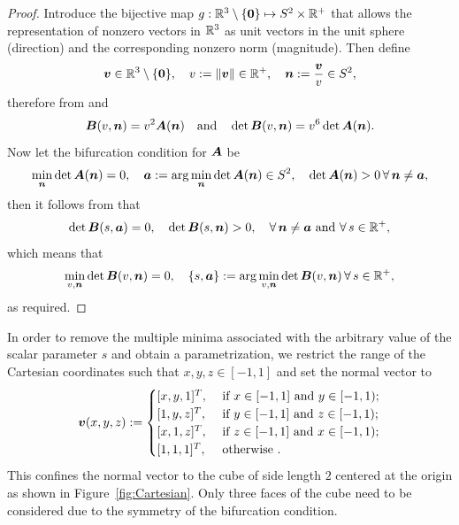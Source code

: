 \documentclass[12pt]{article}
\numberwithin{equation}{section}
\begin{document}
\begin{proof}
  Introduce the bijective map $g : \mathbb{R}^3 \setminus \{\mathbf{0}\}
  \mapsto S^2 \times \mathbb{R}^+$ that allows the representation of
  nonzero vectors in $\mathbb{R}^3$ as unit vectors in the unit sphere
  (direction) and the corresponding nonzero norm (magnitude). Then
  define
  \begin{equation}
    {\boldsymbol{v}} \in \mathbb{R}^3 \setminus \{\mathbf{0}\},
    \quad
    v := \| {\boldsymbol{v}} \| \in \mathbb{R}^+,
    \quad
    {\boldsymbol{n}} := \frac{{\boldsymbol{v}}}{v} \in S^2,
  \end{equation}
  therefore from  and
  \begin{equation} \label{eq:Cartesian-from-acoustic}
      {\boldsymbol{B}}(v, {\boldsymbol{n}})
      =
      v^2 {\boldsymbol{A}}({\boldsymbol{n}})
      \quad \text{and} \quad
      \det {\boldsymbol{B}}(v, {\boldsymbol{n}}) = v^6 \det {\boldsymbol{A}}({\boldsymbol{n}}).
  \end{equation}
  Now let the bifurcation condition for ${\boldsymbol{A}}$ be
  \begin{equation}
    \min_{{\boldsymbol{n}}} \det {\boldsymbol{A}}({\boldsymbol{n}}) = 0,
    \quad
    {\boldsymbol{a}} := \arg \min_{{\boldsymbol{n}}} \det {\boldsymbol{A}}({\boldsymbol{n}}) \in S^2,
    \quad
    \det {\boldsymbol{A}}({\boldsymbol{n}}) > 0 \, \forall \, {\boldsymbol{n}} \neq {\boldsymbol{a}},
  \end{equation}
  then it follows from  that
  \begin{equation}
    \det {\boldsymbol{B}}(s, {\boldsymbol{a}}) = 0,
    \quad
    \det {\boldsymbol{B}}(s, {\boldsymbol{n}}) > 0,
    \quad \forall \, {\boldsymbol{n}} \neq {\boldsymbol{a}}
    \text{ and } \forall \, s \in \mathbb{R}^+,
  \end{equation}
  which means that
  \begin{equation}
    \min_{v, {\boldsymbol{n}}} \det {\boldsymbol{B}}(v, {\boldsymbol{n}}) = 0,
    \quad
    \{s, {\boldsymbol{a}}\} := \arg \min_{v, {\boldsymbol{n}}} \det {\boldsymbol{B}}(v, {\boldsymbol{n}})
    \,
    \forall \, s \in \mathbb{R}^+,
  \end{equation}
  as required.
\end{proof}

In order to remove the multiple minima associated with the arbitrary
value of the scalar parameter $s$ and obtain a parametrization, we
restrict the range of the Cartesian coordinates such that $x,y,z \in
[-1,1]$ and set the normal vector to
\begin{equation}
  {\boldsymbol{v}}(x,y,z)
  :=
  \begin{cases}
    [x,y,1]^T,
    &
    \text{ if }x \in [-1,1] \text{ and } y \in [-1,1);
    \\
    [1,y,z]^T,
    &
    \text{ if }y \in [-1,1] \text{ and } z \in [-1,1);
    \\
    [x,1,z]^T,
    &
    \text{ if }z \in [-1,1] \text{ and } x \in [-1,1);
    \\
    [1,1,1]^T,
    &
    \text{ otherwise }.
  \end{cases}
\end{equation}
This confines the normal vector to the cube of side length $2$
centered at the origin as shown in Figure~\ref{fig:Cartesian}. Only
three faces of the cube need to be considered due to the symmetry of
the bifurcation condition.
\end{document}
